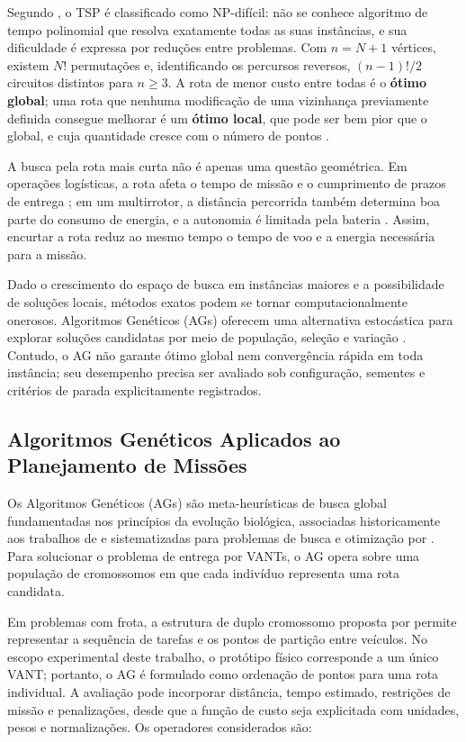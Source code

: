 Segundo , o TSP é classificado como NP-difícil: não se conhece algoritmo de tempo polinomial que resolva exatamente todas as suas instâncias, e sua dificuldade é expressa por reduções entre problemas. Com $n = N+1$ vértices, existem $N!$ permutações e, identificando os percursos reversos, $(n-1)!/2$ circuitos distintos para $n \geq 3$. A rota de menor custo entre todas é o \textbf{ótimo global}; uma rota que nenhuma modificação de uma vizinhança previamente definida consegue melhorar é um \textbf{ótimo local}, que pode ser bem pior que o global, e cuja quantidade cresce com o número de pontos \cite{johnson1997}.

A busca pela rota mais curta não é apenas uma questão geométrica. Em operações logísticas, a rota afeta o tempo de missão e o cumprimento de prazos de entrega \cite{rinaldi2024}; em um multirrotor, a distância percorrida também determina boa parte do consumo de energia, e a autonomia é limitada pela bateria \cite{wu2024}. Assim, encurtar a rota reduz ao mesmo tempo o tempo de voo e a energia necessária para a missão.

Dado o crescimento do espaço de busca em instâncias maiores e a possibilidade de soluções locais, métodos exatos podem se tornar computacionalmente onerosos. Algoritmos Genéticos (AGs) oferecem uma alternativa estocástica para explorar soluções candidatas por meio de população, seleção e variação \cite{goldberg1989,ahmed2024}. Contudo, o AG não garante ótimo global nem convergência rápida em toda instância; seu desempenho precisa ser avaliado sob configuração, sementes e critérios de parada explicitamente registrados.

\subsection{Algoritmos Genéticos Aplicados ao Planejamento de Missões}\label{subsec:ag}

Os Algoritmos Genéticos (AGs) são meta-heurísticas de busca global fundamentadas nos princípios da evolução biológica, associadas historicamente aos trabalhos de  e sistematizadas para problemas de busca e otimização por . Para solucionar o problema de entrega por VANTs, o AG opera sobre uma população de cromossomos em que cada indivíduo representa uma rota candidata.

Em problemas com frota, a estrutura de duplo cromossomo proposta por  permite representar a sequência de tarefas e os pontos de partição entre veículos. No escopo experimental deste trabalho, o protótipo físico corresponde a um único VANT; portanto, o AG é formulado como ordenação de pontos para uma rota individual. A avaliação pode incorporar distância, tempo estimado, restrições de missão e penalizações, desde que a função de custo seja explicitada com unidades, pesos e normalizações. Os operadores considerados são:


